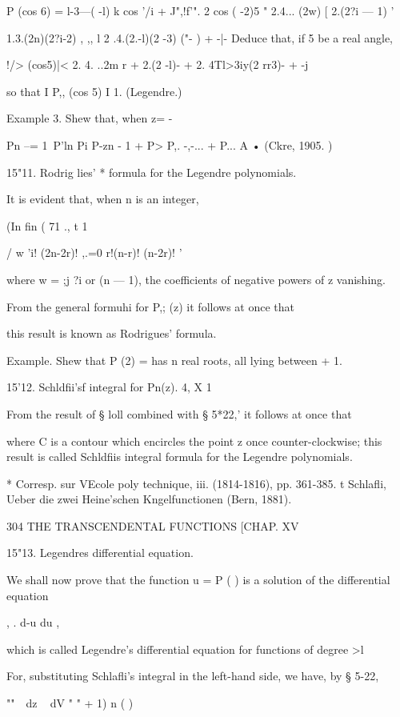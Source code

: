 P (cos 6) = l-3---( -l) k cos '/i + J",!f'". 2 cos ( -2)5 " 2.4...
(2w) [ 2.(2?i — 1) '

1.3.(2n)(2?i-2) , ,, l 2 .4.(2.-l)(2 -3) ("- ) + -|- Deduce that, if 5
be a real angle,

!/> (cos5)|< 2. 4. ..2m r + 2.(2 -l)- + 2. 4Tl>3iy(2 rr3)- + -j

so that I P,, (cos 5) I 1. (Legendre.)

Example 3. Shew that, when z= -\,

Pn --= 1\ P'ln Pi P-zn - 1 + P> P,. -,-... + P... A • (Ckre, 1905. )

15"11. Rodrig lies' * formula for the Legendre polynomials.

It is evident that, when n is an integer,

(In fin ( 71 ., t 1

  / w 'i! (2n-2r)! ,.=0 r!(n-r)! (n-2r)! '

where w = ;j ?i or (n — 1), the coefficients of negative powers of z
vanishing.

From the general formuhi for P,; (z) it follows at once that

this result is known as Rodrigues' formula.

Example. Shew that P (2) = has n real roots, all lying between + 1.

15'12. Schldfii'sf integral for Pn(z). 4, X 1

From the result of § loll combined with § 5*22,' it follows at once
that

where C is a contour which encircles the point z once
counter-clockwise; this result is called Schldfiis integral formula
for the Legendre polynomials.

* Corresp. sur VEcole poly technique, iii. (1814-1816), pp. 361-385. t
Schlafli, Ueber die zwei Heine'schen Kngelfunctionen (Bern, 1881).

304 THE TRANSCENDENTAL FUNCTIONS [CHAP. XV

15"13. Legendres differential equation.

We shall now prove that the function u = P ( ) is a solution of the
differential equation

, . d-u du ,

which is called Legendre's differential equation for functions of
degree >l

For, substituting Schlafli's integral in the left-hand side, we have,
by § 5-22,

  ""~~dz ~ dV " " + 1) n ( )


